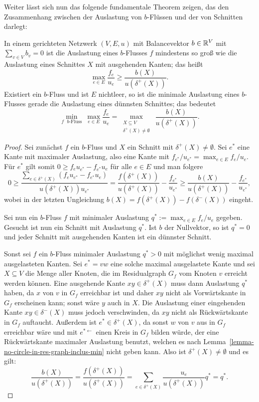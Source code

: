 Weiter lässt sich nun das folgende fundamentale Theorem zeigen, das den Zusammenhang zwischen der Auslastung von $b$-Flüssen und der von Schnitten darlegt:

\begin{theorem}\label{thm-strong-duality-sparsest-cut-min-flow}
	In einem gerichteten Netzwerk $(V, E, u)$ mit Balancevektor $b\in\mathbb{R}^V$ mit $\sum_{v\in V}b_v = 0$ ist die Auslastung eines $b$-Flusses $f$ mindestens so groß wie die Auslastung eines Schnittes $X$ mit ausgehenden Kanten; das heißt \[\max_{e\in E} \frac{f_e}{u_e} \geq \frac{b(X)}{u(\delta^+(X))}.\]
	Existiert ein $b$-Fluss und ist $E$ nichtleer, so ist die minimale Auslastung eines $b$-Flusses gerade die Auslastung eines dünnsten Schnittes; das bedeutet
	\[
	\min_{\text{$f$ $b$-Fluss}}~\max_{e\in E}\frac{f_e}{u_e} = \max_{\substack{X\subseteq V\\ \delta^+(X)\neq\emptyset}} ~ \frac{b(X)}{u(\delta^+(X))}.
	\]
\end{theorem}
\begin{proof}
	Sei zunächst $f$ ein $b$-Fluss und $X$ ein Schnitt mit $\delta^+(X)\neq\emptyset$.
	Sei $e^*$ eine Kante mit maximaler Auslastung, also eine Kante mit $f_{e^*}/u_{e^*}=\max_{e\in E} f_e / u_e$.
	Für $e^*$ gilt somit $0\geq f_e u_{e^*} - f_{e^*}u_e$ für alle $e\in E$ und man folgere
	\[
	0\geq \frac{\sum_{e\in \delta^+(X)}(f_e u_{e^*} - f_{e^*}u_e)}{u(\delta^+(X)) u_{e^*}} = \frac{f(\delta^+(X))}{u(\delta^+(X))} - \frac{f_{e^*}}{u_{e^*}} \geq \frac{b(X)}{u(\delta^+(X))} - \frac{f_{e^*}}{u_{e^*}},
	\]
	wobei in der letzten Ungleichung $b(X) = f(\delta^+(X)) - f(\delta^-(X))$ eingeht.
	
	Sei nun ein $b$-Fluss $f$ mit minimaler Auslastung $q^*:=\max_{e\in E} f_e/u_e$ gegeben.
	Gesucht ist nun ein Schnitt mit Auslastung $q^*$.
	Ist $b$ der Nullvektor, so ist $q^*=0$ und jeder Schnitt mit ausgehenden Kanten ist ein dünnster Schnitt.
	
	Sonst sei $f$ ein $b$-Fluss minimaler Auslastung $q^* > 0$ mit möglichst wenig maximal ausgelasteten Kanten.
	Sei $e^*=vw$ eine solche maximal ausgelastete Kante und sei $X\subseteq V$ die Menge aller Knoten, die im Residualgraph $G_f$ vom Knoten $v$ erreicht werden können.
	Eine ausgehende Kante $xy\in\delta^+(X)$ muss dann Auslastung $q^*$ haben, da $x$ von $v$ in $G_f$ erreichbar ist und daher $xy$ nicht als Vorwärtskante in $G_f$ erscheinen kann; sonst wäre $y$ auch in $X$.
	Die Auslastung einer eingehenden Kante $xy\in\delta^-(X)$ muss jedoch verschwinden, da $xy$ nicht als Rückwärtskante in $G_f$ auftaucht.
	Außerdem ist $e^*\in \delta^+(X)$, da sonst $w$ von $v$ aus in $G_f$ erreichbar wäre und mit $e^{*\leftarrow}$ einen Kreis in $G_f$ bilden würde, der eine Rückwärtskante maximaler Auslastung benutzt, welchen es nach Lemma~\ref{lemma-no-circle-in-res-graph-inclus-min} nicht geben kann.
	Also ist $\delta^+(X)\neq \emptyset$ und es gilt:
	\[
	\frac{b(X)}{u(\delta^+(X))} = \frac{f(\delta^+(X))}{u(\delta^+(X))} = \sum_{e\in\delta^+(X)} \frac{u_e}{u(\delta^+(X))} q^* = q^*.
	\]
\end{proof}


